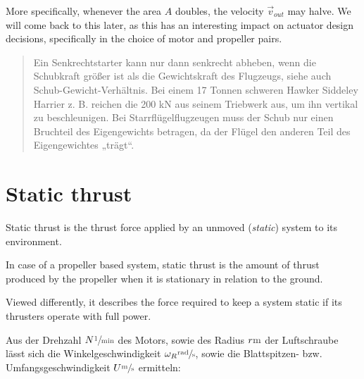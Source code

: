 More specifically, whenever the area $A$ doubles, the velocity $\vec{v}_{out}$ may halve. 
We will come back to this later, as this has an interesting impact on actuator design decisions, specifically in the choice of motor and propeller pairs.




\begin{quote}
Ein Senkrechtstarter kann nur dann senkrecht abheben, wenn die Schubkraft größer ist als die Gewichtskraft des Flugzeugs, siehe auch Schub-Gewicht-Verhältnis. Bei einem 17 Tonnen schweren Hawker Siddeley Harrier z. B. reichen die 200 kN aus seinem Triebwerk aus, um ihn vertikal zu beschleunigen. Bei Starrflügelflugzeugen muss der Schub nur einen Bruchteil des Eigengewichts betragen, da der Flügel den anderen Teil des Eigengewichtes „trägt“.
\end{quote}


\section{Static thrust}


Static thrust %
is the thrust force applied by an unmoved (\textit{static}) system to its environment.

In case of a propeller based system, static thrust is the amount of thrust 
produced by the propeller when it is stationary in relation to the ground.

Viewed differently, it describes the force required to keep a system static if its 
thrusters operate with full power. 



\bigbreak

Aus der Drehzahl 
$N \withunit{\per\minute}$ 
des Motors, sowie des Radius 
$r \withunit{\metre}$ 
der Luftschraube lässt sich die Winkelgeschwindigkeit 
$\omega_R \withunit{\radian\per\second}$, 
sowie die Blattspitzen- bzw. Umfangsgeschwindigkeit 
$U \withunit{\metre\per\second}$ 
ermitteln:

